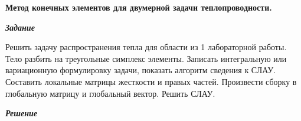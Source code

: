 \documentclass[a4paper, 12pt]{article}
\begin{document}
\begin{center}
\textbf{Метод конечных элементов для двумерной задачи теплопроводности.}
\end{center}
\begin{center}
\textbf{\textit{Задание}}
\end{center}

Решить задачу распространения тепла для области из 1 лабораторной работы. Тело разбить на треугольные симплекс элементы. Записать интегральную или вариационную формулировку задачи, показать алгоритм сведения к СЛАУ. Составить локальные матрицы жесткости и правых частей. Произвести сборку в глобальную матрицу и глобальный вектор. Решить СЛАУ.

\begin{center}
\textbf{\textit{Решение}}
\end{center}
\end{document}
